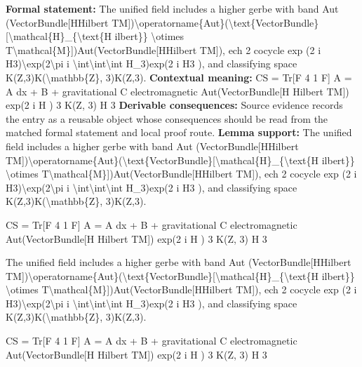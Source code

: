 \begingroup\footnotesize\setlength{\emergencystretch}{3em}\sloppy
\textbf{Formal statement:} The unified field includes a higher gerbe with band Aut (VectorBundle[HHilbert TM])\textbackslash{}operatorname\{Aut\}(\textbackslash{}text\{VectorBundle\}[\textbackslash{}mathcal\{H\}\_\{\textbackslash{}text\{H ilbert\}\} \textbackslash{}otimes T\textbackslash{}mathcal\{M\}])Aut(VectorBundle[HHilbert  TM]),  ech 2 cocycle exp (2 i   H3)\textbackslash{}exp(2\textbackslash{}pi i \textbackslash{}int\textbackslash{}int\textbackslash{}int H\_3)exp(2 i   H3 ), and classifying space K(Z,3)K(\textbackslash{}mathbb\{Z\}, 3)K(Z,3).
\textbf{Contextual meaning:} CS = Tr[F   4  1    F] A =   A dx +     B + gravitational C electromagnetic Aut(VectorBundle[H   Hilbert TM]) exp(2 i H )     3 K(Z, 3) H 3
\textbf{Derivable consequences:} Source evidence records the entry as a reusable object whose consequences should be read from the matched formal statement and local proof route.
\textbf{Lemma support:} The unified field includes a higher gerbe with band Aut (VectorBundle[HHilbert TM])\textbackslash{}operatorname\{Aut\}(\textbackslash{}text\{VectorBundle\}[\textbackslash{}mathcal\{H\}\_\{\textbackslash{}text\{H ilbert\}\} \textbackslash{}otimes T\textbackslash{}mathcal\{M\}])Aut(VectorBundle[HHilbert  TM]),  ech 2 cocycle exp (2 i   H3)\textbackslash{}exp(2\textbackslash{}pi i \textbackslash{}int\textbackslash{}int\textbackslash{}int H\_3)exp(2 i   H3 ), and classifying space K(Z,3)K(\textbackslash{}mathbb\{Z\}, 3)K(Z,3).\par
\endgroup

CS = Tr[F   4  1    F] A =   A dx +     B + gravitational C electromagnetic Aut(VectorBundle[H   Hilbert TM]) exp(2 i H )     3 K(Z, 3) H 3

The unified field includes a higher gerbe with band Aut (VectorBundle[HHilbert TM])\textbackslash{}operatorname\{Aut\}(\textbackslash{}text\{VectorBundle\}[\textbackslash{}mathcal\{H\}\_\{\textbackslash{}text\{H ilbert\}\} \textbackslash{}otimes T\textbackslash{}mathcal\{M\}])Aut(VectorBundle[HHilbert  TM]),  ech 2 cocycle exp (2 i   H3)\textbackslash{}exp(2\textbackslash{}pi i \textbackslash{}int\textbackslash{}int\textbackslash{}int H\_3)exp(2 i   H3 ), and classifying space K(Z,3)K(\textbackslash{}mathbb\{Z\}, 3)K(Z,3).

CS = Tr[F   4  1    F] A =   A dx +     B + gravitational C electromagnetic Aut(VectorBundle[H   Hilbert TM]) exp(2 i H )     3 K(Z, 3) H 3
\endgroup

